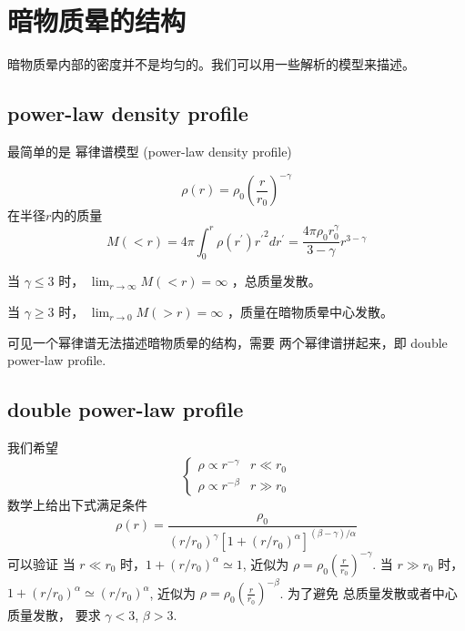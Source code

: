 \section{暗物质晕的结构}

暗物质晕内部的密度并不是均匀的。我们可以用一些解析的模型来描述。

\subsection{power-law density profile}

最简单的是 幂律谱模型 (power-law density profile)

\begin{equation}
    \rho(r)=\rho_{0}\left(\frac{r}{r_{0}}\right)^{-\gamma}
\end{equation}
在半径$r$内的质量
\begin{equation}
    M(<r)=4 \pi \int_{0}^{r} \rho\left(r^{\prime}\right){r^{\prime}}^{2} d r^{\prime}=\frac{4 \pi \rho_{0} r_{0}^{\gamma}}{3-\gamma} r^{3-\gamma}
\end{equation}

当 $\gamma \leq 3$ 时， $\lim _{r \rightarrow \infty} M(<r)=\infty$ ，总质量发散。

当 $\gamma \geq 3$ 时， $\lim_{r \rightarrow 0} M(>r)=\infty$ ，质量在暗物质晕中心发散。 

可见一个幂律谱无法描述暗物质晕的结构，需要 两个幂律谱拼起来，即 double power-law profile.


\subsection{double power-law profile}
我们希望
\begin{equation}
    \begin{cases}\rho \propto r^{-\gamma} & r \ll r_{0} \\ \rho \propto r^{-\beta} & r \gg r_{0}\end{cases}
\end{equation}
数学上给出下式满足条件
\begin{equation} \label{eq:double-pl}
    \rho(r)=\frac{\rho_{0}}{\left(r / r_{0}\right)^{\gamma}\left[1+\left(r / r_{0}\right)^{\alpha}\right]^{(\beta-\gamma) / \alpha}}
\end{equation}
可以验证
当 $r \ll r_0$ 时，$1+(r/r_0)^{\alpha} \simeq 1$,  近似为 $\rho = \rho_0 \left(\frac{r}{r_0}\right) ^{-\gamma}$. 
当 $r \gg r_0$ 时，$1+(r/r_0)^{\alpha} \simeq (r/r_0)^{\alpha}$,  近似为 $\rho = \rho_0 \left(\frac{r}{r_0}\right) ^{-\beta}$.
为了避免 总质量发散或者中心质量发散，
要求
$\gamma < 3$, $\beta > 3$.

